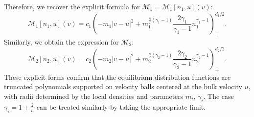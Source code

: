 \documentclass[10pt,reqno]{amsart}
\numberwithin{equation}{section}
\begin{document}
Therefore, we recover the explicit formula for $\mathcal{M}_1 = \mathcal{M}_1[n_1, u](v)$:
\[
\mathcal{M}_1[n_1, u](v) = c_1 \left( -m_1 |v - u|^2 + m_1^{\frac{n}{2}(\gamma_1 - 1)}  \frac{2\gamma_1}{\gamma_1 - 1} n_1^{\gamma_1 - 1} \right)_+^{d_1/2}.
\]
Similarly, we obtain the expression for $\mathcal{M}_2$:
\[
\mathcal{M}_2[n_2, u](v) = c_2 \left( -m_2 |v - u|^2 + m_2^{\frac{n}{2}(\gamma_2 - 1)}  \frac{2\gamma_2}{\gamma_2 - 1} n_2^{\gamma_2 - 1} \right)_+^{d_2/2}.
\]
These explicit forms confirm that the equilibrium distribution functions are truncated polynomials supported on velocity balls centered at the bulk velocity $u$, with radii determined by the local densities and parameters $m_i$, $\gamma_i$. The case $\gamma_i = 1 + \frac2n$ can be treated similarly by taking the appropriate limit.

%
%
%                         
%
%
\end{document}
